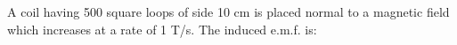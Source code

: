 A coil having 500 square loops of side 10 cm is placed normal to 
a magnetic field which increases at a rate of 1 T/s. The induced e.m.f. is: